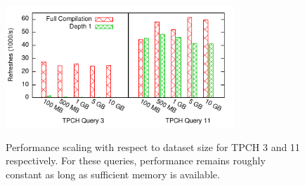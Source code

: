 \begin{figure}
\begin{center}
\includegraphics[width=3.4in]{../graphs/graphs/scaling.pdf} \\
\vspace{-3mm}
\caption{Performance scaling with respect to dataset size for TPCH 3 and 11 respectively.  For these queries, performance remains roughly constant as long as sufficient memory is available.}
\label{fig:experiments:big}

\end{center}\vspace*{-0.3in}
\end{figure}



